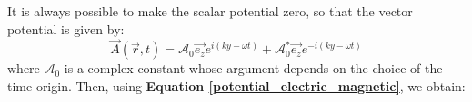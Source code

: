 It is always possible to make the scalar potential zero, so that the vector potential is given by:
\begin{equation}
    \vec A(\vec r, t) = \mathcal{A}_0 \vec{e_z}e^{i(ky-\omega t)} + \mathcal{A}_0^* \vec{e_z}e^{-i(ky-\omega t)}
\end{equation}
where $\mathcal{A}_0$ is a complex constant whose argument depends on the choice of the time origin. Then, using \textbf{Equation \ref{potential_electric_magnetic}}, we obtain:

\fi
